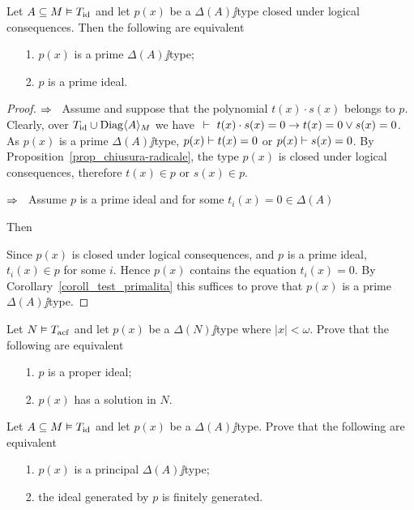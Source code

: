 \documentclass[creche.tex]{subfiles}
\begin{document}
\begin{proposition}\label{prop_tipi_e_ideali_primi}
Let $A\subseteq M\models T_{\rm id}$ and let $p(x)$ be a $\Delta(A)\jj$type closed under logical consequences. Then the following are equivalent
\begin{itemize}
\item[1.] $p(x)$ is a prime $\Delta(A)\jj$type;
\item[2.] $p$ is a prime ideal.
\end{itemize}
\end{proposition}

\begin{proof}
$\IMP$ \ Assume  and suppose that the polynomial $t(x)\cdot s(x)$ belongs to $p$. Clearly, over $T_{\rm id} \cup\Diag\<A\>_M$  we have $\ \proves\ t(x)\cdot s(x)=0\imp  t(x)=0\vee s(x)=0$. As $p(x)$ is a prime $\Delta(A)\jj$type, $p(x)\proves t(x)=0$ or $p(x)\proves s(x)=0$. By Proposition~\ref{prop_chiusura-radicale}, the type $p(x)$ is closed under logical consequences, therefore $t(x)\in p$ or $s(x)\in p$.

$\IMP$ \ Assume $p$ is a prime ideal and for some $t_i(x)=0\in\Delta(A)$


Then


Since $p(x)$ is closed under logical consequences, and $p$ is a prime ideal, $t_i(x)\in p$ for some $i$. Hence $p(x)$ contains the equation $t_i(x)=0$. By Corollary~\ref{coroll_test_primalita} this suffices to prove that $p(x)$ is a prime $\Delta(A)\jj$type.
\end{proof}




\begin{exercise}\label{ex_weakNullstellensatz}Let $N\models T_{\rm acf}$ and let $p(x)$ be a $\Delta(N)\jj$type where $|x|<\omega$. Prove that the following are equivalent
\begin{itemize}
\item[1.] $p$ is a proper ideal;
\item[2.] $p(x)$ has a solution in $N$.\QED
\end{itemize}
\end{exercise}


\begin{exercise}\label{ex_fingen_principal}
Let $A\subseteq M\models T_{\rm id}$ and let $p(x)$ be a $\Delta(A)\jj$type. Prove that the following are equivalent
\begin{itemize}
\item[1.] $p(x)$ is a principal $\Delta(A)\jj$type;
\item[2.] the ideal generated by $p$ is finitely generated.\QED
\end{itemize}
\end{exercise}
\end{document}
